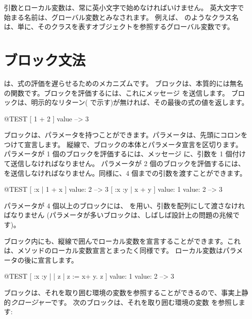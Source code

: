 \documentclass[a4paper,10pt,twoside]{book}
\begin{document}
引数とローカル変数は、常に英小文字で始めなければいけません。
英大文字で始まる名前は、グローバル変数とみなされます。
例えば、 のようなクラス名は、単に、そのクラスを表すオブジェクトを参照するグローバル変数です。

\section{ブロック文法}

は、式の評価を遅らせるためのメカニズムです。
ブロックは、本質的には無名の関数です。ブロックを評価するには、これにメッセージ  を送信します。
ブロックは、明示的なリターン(\ct{^} で示す)が無ければ、その最後の式の値を返します。

\begin{code}{@TEST}
[ 1 + 2 ] value --> 3
\end{code}

ブロックは、パラメータを持つことができます。パラメータは、先頭にコロンをつけて宣言します。
縦線で、ブロックの本体とパラメータ宣言を区切ります。
パラメータが 1 個のブロックを評価するには、メッセージ  に、引数を 1 個付けて送信しなければなりません。
パラメータが 2 個のブロックを評価するには、を送信しなければなりません。同様に、4 個までの引数を渡すことができます。

\begin{code}{@TEST}
[ :x | 1 + x ] value: 2 --> 3
[ :x :y | x + y ] value: 1 value: 2 --> 3
\end{code}

パラメータが 4 個以上のブロックには、 を用い、引数を配列にして渡さなければなりません
(パラメータが多いブロックは、しばしば設計上の問題の兆候です)。

ブロック内にも、縦線で囲んでローカル変数を宣言することができます。これは、メソッドのローカル変数宣言とまったく同様です。
ローカル変数はパラメータの後に宣言します。

\begin{code}{@TEST}
[ :x :y | | z | z := x+ y. z ] value: 1 value: 2 --> 3
\end{code}

ブロックは、それを取り囲む環境の変数を参照することができるので、事実上静的\emph{クロージャー}です。
次のブロックは、それを取り囲む環境の変数  を参照します:
\end{document}
